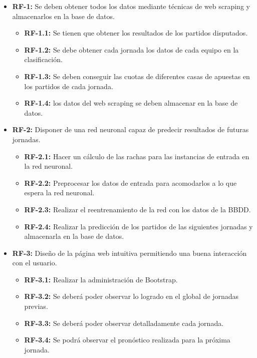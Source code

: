 \begin{itemize}
\item \textbf{RF-1: }Se deben obtener todos los datos mediante técnicas de web scraping y almacenarlos en la base de datos.
\begin{itemize}
\item \textbf{RF-1.1: }Se tienen que obtener los resultados de los partidos disputados.

\item \textbf{RF-1.2: }Se debe obtener cada jornada los datos de cada equipo en la clasificación.

\item \textbf{RF-1.3: }Se deben conseguir las cuotas de diferentes casas de apuestas en los partidos de cada jornada.

\item \textbf{RF-1.4: }los datos del web scraping se deben almacenar en la base de datos.

\end{itemize}

\item \textbf{RF-2: }Disponer de una red neuronal capaz de predecir resultados de futuras jornadas.
\begin{itemize}

\item \textbf{RF-2.1: }Hacer un cálculo de las rachas para las instancias de entrada en la red neuronal.

\item \textbf{RF-2.2: }Preprocesar los datos de entrada para acomodarlos a lo que espera la red neuronal.

\item \textbf{RF-2.3: }Realizar el reentrenamiento de la red con los datos de la BBDD.

\item \textbf{RF-2.4: }Realizar la predicción de los partidos de las siguientes jornadas y almacenarla en la base de datos.

\end{itemize}

\item \textbf{RF-3: }Diseño de la página web intuitiva permitiendo una buena interacción con el usuario.

\begin{itemize}
\item \textbf{RF-3.1: }Realizar la administración de Bootstrap.

\item \textbf{RF-3.2: }Se deberá poder observar lo logrado en el global de jornadas previas.

\item \textbf{RF-3.3: }Se deberá poder observar detalladamente cada jornada.

\item \textbf{RF-3.4: }Se podrá observar el pronóstico realizada para la próxima jornada.
\end{itemize}

\end{itemize}

